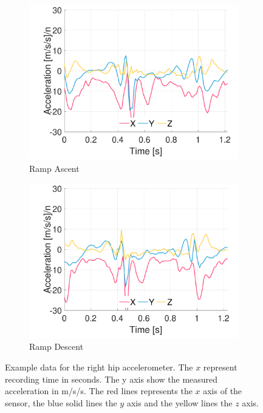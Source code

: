 \begin{figure}[p]
    \begin{subfigure}[b]{0.49\textwidth}
         \centering
         \includegraphics[width=\textwidth]{content/3-Methods/example-data/ch3_example_data_subject_01_r_hip_accel_activity_ramp_up.pdf}
         \caption{Ramp Ascent}
    \end{subfigure}
    \begin{subfigure}[b]{0.49\textwidth}
         \centering
         \includegraphics[width=\textwidth]{content/3-Methods/example-data/ch3_example_data_subject_01_r_hip_accel_activity_ramp_down.pdf}
         \caption{Ramp Descent}
    \end{subfigure}
    \caption[Example right hip accelerometer data]{Example data for the right hip accelerometer. The $x$ represent recording time in seconds. The y axis show the measured acceleration in m/s/s. The red lines represents the $x$ axis of the sensor, the blue solid lines the $y$ axis and the yellow lines the $z$ axis.}
    \label{fig:example-right-hip-accel-sensor-data}
\end{figure}

